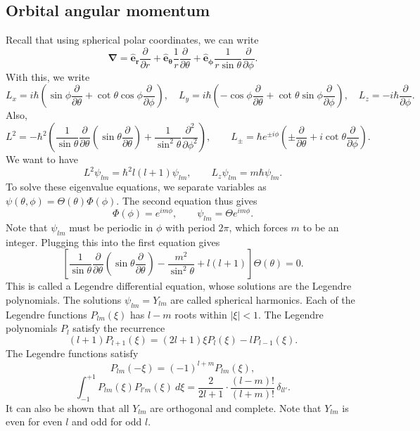 \documentclass[11pt]{article}
\newcommand\ve[1]{\boldsymbol{#1}}
\newcommand\pp[3][]{\frac{\partial^{#1}{#2}}{\partial {#3}^{#1}}}
\newcommand\grad[1]{\ve{\nabla}#1}
\def\ver{\ve{\hat{e}_r}}
\def\veth{\ve{\hat{e}_\theta}}
\def\veph{\ve{\hat{e}_\phi}}
\theoremstyle{definition}
\theoremstyle{remark}
\numberwithin{equation}{section}
\begin{document}
    \subsection{Orbital angular momentum}
    Recall that using spherical polar coordinates, we can write \[
        \grad{} = \ver\pp{}{r} +
        \veth\frac{1}{r}\pp{}{\theta} +
        \veph\frac{1}{r\sin\theta}\pp{}{\phi}.
    \] With this, we write \[
        L_x = i\hbar\left(\sin\phi\pp{}{\theta} +
        \cot\theta\cos\phi\pp{}{\phi}\right), \quad
        L_y = i\hbar\left(-\cos\phi\pp{}{\theta} +
        \cot\theta\sin\phi\pp{}{\phi}\right), \quad
        L_z = -i\hbar\pp{}{\phi}.
    \] Also, \[
        L^2 =
        -\hbar^2\left(\frac{1}{\sin\theta}\pp{}{\theta}\left(\sin\theta\pp{}{\theta}
        \right) + \frac{1}{\sin^2\theta}\pp[2]{}{\phi}\right), \qquad
        L_{\pm} = \hbar e^{\pm i\phi}\left(\pm\pp{}{\theta} +
        i\cot\theta\pp{}{\phi}\right).
    \] We want to have \[
        L^2 \psi_{lm} = \hbar^2 l(l + 1)\psi_{lm}, \qquad L_z\psi_{lm} =
        m\hbar\psi_{lm}.
    \] To solve these eigenvalue equations, we separate variables as $\psi(\theta,
    \phi) = \Theta(\theta) \Phi(\phi)$. The second equation thus gives \[
        \Phi(\phi) = e^{im\phi}, \qquad \psi_{lm} = \Theta e^{im\phi}.
    \] Note that $\psi_{lm}$ must be periodic in $\phi$ with period $2\pi$, which
    forces $m$ to be an integer. Plugging this into the first equation gives \[
        \left[\frac{1}{\sin\theta}\pp{}{\theta}\left(\sin\theta\pp{}{\theta}\right)
        - \frac{m^2}{\sin^2\theta} + l(l + 1)\right]\Theta(\theta) = 0.
    \] This is called a Legendre differential equation, whose solutions are the
    Legendre polynomials. The solutions $\psi_{lm} = Y_{lm}$ are called spherical
    harmonics. Each of the Legendre functions $P_{lm}(\xi)$ has $l - m$ roots
    within $|\xi| < 1$. The Legendre polynomials $P_l$ satisfy the recurrence \[
        (l + 1)P_{l + 1}(\xi) = (2l + 1)\xi P_{l}(\xi) - lP_{l - 1}(\xi).
    \] The Legendre functions satisfy \[
        P_{lm}(-\xi) = (-1)^{l + m} P_{lm}(\xi),
    \] \[
        \int_{-1}^{+1}P_{lm}(\xi)P_{l'm}(\xi)\:d\xi = \frac{2}{2l + 1}\cdot \frac{(l
        - m)!}{(l + m)!}\,\delta_{ll'}.
    \] It can also be shown that all $Y_{lm}$ are orthogonal and complete. Note that
    $Y_{lm}$ is even for even $l$ and odd for odd $l$.
    
\end{document}
